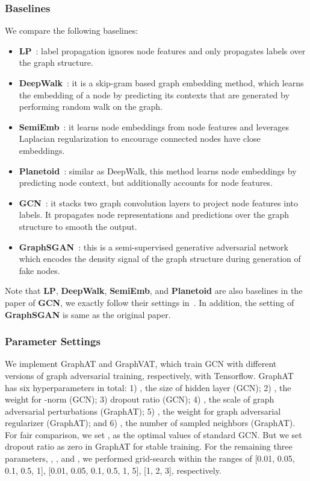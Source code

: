 \documentclass[10pt,journal,compsoc]{IEEEtran}
\begin{document}
\subsubsection{Baselines}
We compare the following baselines:
\begin{itemize}[leftmargin=*]
	\item \textbf{LP}~\cite{zhu2003semi}: label propagation ignores node features and only propagates labels over the graph structure.
	\item \textbf{DeepWalk}~\cite{perozzi2014deepwalk}: it is a skip-gram based graph embedding method, which learns the embedding of a node by predicting its contexts that are generated by performing random walk on the graph.
	\item \textbf{SemiEmb}~\cite{weston2012deep}: it learns node embeddings from node features and leverages Laplacian regularization to encourage connected nodes have close embeddings.
	\item \textbf{Planetoid}~\cite{yang2016revisiting}: similar as DeepWalk, this method learns node embeddings by predicting node context, but additionally accounts for node features.
	\item \textbf{GCN}~\cite{kipf2017semi}: it stacks two graph convolution layers to project node features into labels. It propagates node representations and predictions over the graph structure to smooth the output.
	\item \textbf{GraphSGAN}~\cite{ding2018semi}: this is a semi-supervised generative adversarial network which encodes the density signal of the graph structure during generation of fake nodes.
\end{itemize}
Note that \textbf{LP}, \textbf{DeepWalk}, \textbf{SemiEmb}, and \textbf{Planetoid} are also baselines in the paper of \textbf{GCN}, we exactly follow their settings in~\cite{kipf2017semi}. In addition, the setting of \textbf{GraphSGAN} is same as the original paper.


\subsubsection{Parameter Settings}
We implement GraphAT and GraphVAT, which train GCN with different versions of graph adversarial training, respectively, with Tensorflow. 
GraphAT has six hyperparameters in total: 1) , the size of hidden layer (GCN); 2) , the weight for -norm (GCN); 3) dropout ratio (GCN); 4) , the scale of graph adversarial perturbations (GraphAT); 5) , the weight for graph adversarial regularizer (GraphAT); and 6) , the number of sampled neighbors (GraphAT). 
For fair comparison, we set ,  as the optimal values of standard GCN. But we set dropout ratio as zero in GraphAT for stable training. For the remaining three parameters, , , and , we performed grid-search within the ranges of [0.01, 0.05, 0.1, 0.5, 1], [0.01, 0.05, 0.1, 0.5, 1, 5], [1, 2, 3], respectively.
\end{document}

